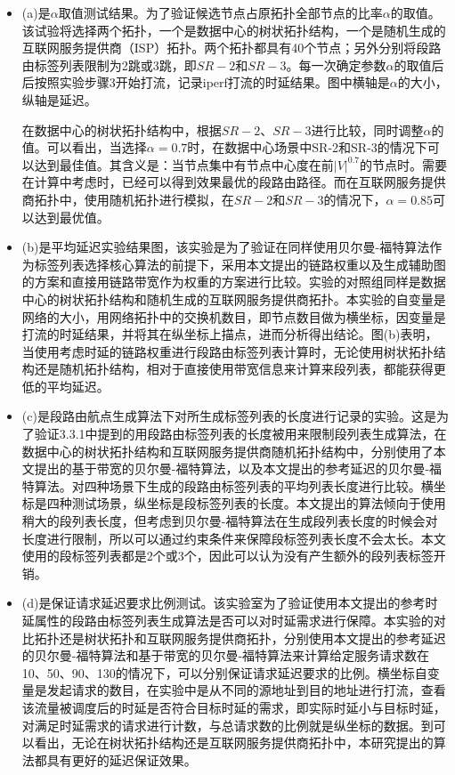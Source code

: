 \begin{itemize}
\item (a)是$\alpha$取值测试结果。为了验证候选节点占原拓扑全部节点的比率$\alpha$的取值。该试验将选择两个拓扑，一个是数据中心的树状拓扑结构，一个是随机生成的互联网服务提供商（ISP）拓扑。两个拓扑都具有40个节点；另外分别将段路由标签列表限制为2跳或3跳，即$SR-2$和$SR-3$。每一次确定参数$\alpha$的取值后后按照实验步骤3开始打流，记录iperf打流的时延结果。图中横轴是$\alpha$的大小，纵轴是延迟。

在数据中心的树状拓扑结构中，根据$SR-2$、$SR-3$进行比较，同时调整$\alpha$的值。可以看出，当选择$\alpha=0.7$时，在数据中心场景中SR-2和SR-3的情况下可以达到最佳值。其含义是：当节点集中有节点中心度在前${|V|}^{0.7}$的节点时。需要在计算中考虑时，已经可以得到效果最优的段路由路径。而在互联网服务提供商拓扑中，使用随机拓扑进行模拟，在$SR-2$和$SR-3$的情况下，$\alpha=0.85$可以达到最优值。

\item (b)是平均延迟实验结果图，该实验是为了验证在同样使用贝尔曼-福特算法作为标签列表选择核心算法的前提下，采用本文提出的链路权重以及生成辅助图的方案和直接用链路带宽作为权重的方案进行比较。实验的对照组同样是数据中心的树状拓扑结构和随机生成的互联网服务提供商拓扑。本实验的自变量是网络的大小，用网络拓扑中的交换机数目，即节点数目做为横坐标，因变量是打流的时延结果，并将其在纵坐标上描点，进而分析得出结论。图(b)表明，当使用考虑时延的链路权重进行段路由标签列表计算时，无论使用树状拓扑结构还是随机拓扑结构，相对于直接使用带宽信息来计算来段列表，都能获得更低的平均延迟。
\item (c)是段路由航点生成算法下对所生成标签列表的长度进行记录的实验。这是为了验证3.3.1中提到的用段路由标签列表的长度被用来限制段列表生成算法，在数据中心的树状拓扑结构和互联网服务提供商随机拓扑结构中，分别使用了本文提出的基于带宽的贝尔曼-福特算法，以及本文提出的参考延迟的贝尔曼-福特算法。对四种场景下生成的段路由标签列表的平均列表长度进行比较。横坐标是四种测试场景，纵坐标是段标签列表的长度。本文提出的算法倾向于使用稍大的段列表长度，但考虑到贝尔曼-福特算法在生成段列表长度的时候会对长度进行限制，所以可以通过约束条件来保障段标签列表长度不会太长。本文使用的段标签列表都是2个或3个，因此可以认为没有产生额外的段列表标签开销。
\item (d)是保证请求延迟要求比例测试。该实验室为了验证使用本文提出的参考时延属性的段路由标签列表生成算法是否可以对时延需求进行保障。本实验的对比拓扑还是树状拓扑和互联网服务提供商拓扑，分别使用本文提出的参考延迟的贝尔曼-福特算法和基于带宽的贝尔曼-福特算法来计算给定服务请求数在10、50、90、130的情况下，可以分别保证请求延迟要求的比例。横坐标自变量是发起请求的数目，在实验中是从不同的源地址到目的地址进行打流，查看该流量被调度后的时延是否符合目标时延的需求，即实际时延小与目标时延，对满足时延需求的请求进行计数，与总请求数的比例就是纵坐标的数据。到可以看出，无论在树状拓扑结构还是互联网服务提供商拓扑中，本研究提出的算法都具有更好的延迟保证效果。
\end{itemize}

